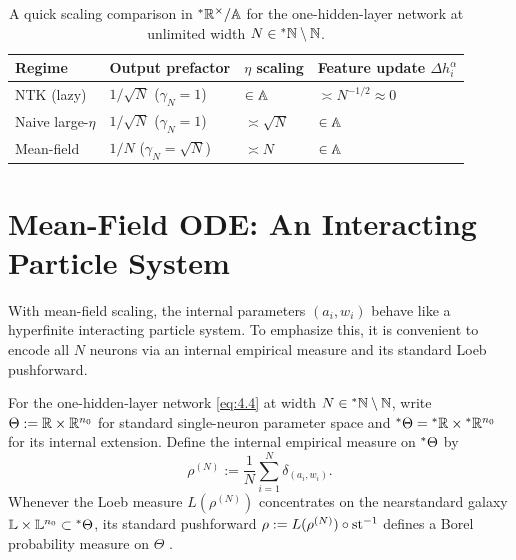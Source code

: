 \begin{table}[t]
\centering
\begin{tabular}{@{}llll@{}}
\toprule
Regime & Output prefactor & $\eta$ scaling & Feature update $\Delta h_i^\alpha$ \\
\midrule
NTK (lazy) & $1/\sqrt{N}$ ($\gamma_N = 1$) & $\in \mathbb{A}$ & $\asymp N^{-1/2} \approx 0$ \\
Naive large-$\eta$ & $1/\sqrt{N}$ ($\gamma_N = 1$) & $\asymp \sqrt{N}$ & $\in \mathbb{A}$ \\
Mean-field & $1/N$ ($\gamma_N = \sqrt{N}$) & $\asymp N$ & $\in \mathbb{A}$ \\
\bottomrule
\end{tabular}
\caption{A quick scaling comparison in ${}^*\mathbb{R}^\times / \mathbb{A}$ for the one-hidden-layer network at unlimited width $N \in {}^*\mathbb{N} \setminus \mathbb{N}$.}
\label{tab:4.1}
\end{table}

\section{Mean-Field ODE: An Interacting Particle System}
\label{sec:4.2}

With mean-field scaling, the internal parameters $(a_i, w_i)$ behave like a hyperfinite interacting particle system. To emphasize this, it is convenient to encode all $N$ neurons via an internal empirical measure and its standard Loeb pushforward.

\begin{definition}\label{def:4.2}
For the one-hidden-layer network \eqref{eq:4.4} at width $N \in {}^*\mathbb{N} \setminus \mathbb{N}$, write $\Theta := \mathbb{R} \times \mathbb{R}^{n_0}$ for standard single-neuron parameter space and ${}^*\Theta = {}^*\mathbb{R} \times {}^*\mathbb{R}^{n_0}$ for its internal extension. Define the internal empirical measure on ${}^*\Theta$ by
\begin{equation}\label{eq:4.16}
\rho^{(N)} := \frac{1}{N}\sum_{i=1}^N \delta_{(a_i, w_i)}.
\end{equation}
Whenever the Loeb measure $L(\rho^{(N)})$ concentrates on the nearstandard galaxy $\mathbb{L} \times \mathbb{L}^{n_0} \subset {}^*\Theta$, its standard pushforward $\rho := L(\rho^{(N)}) \circ \operatorname{st}^{-1}$ defines a Borel probability measure on $\Theta$ \cite{loeb1975conversion}.
\end{definition}


